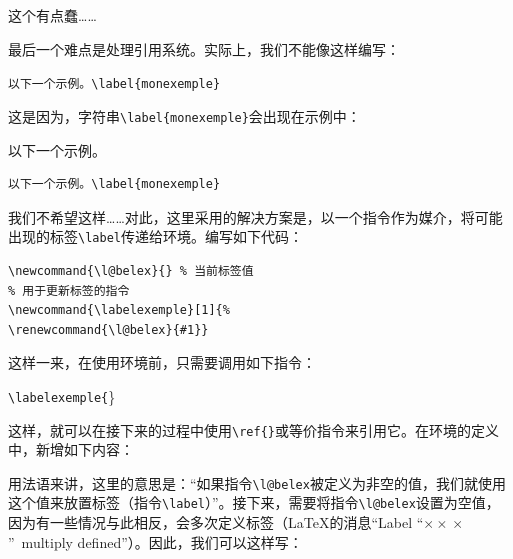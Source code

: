 \begin{ltxexempleiii}
  \setlength{\fboxsep}{-2pt}
  \setlength{\fboxrule}{.5mm}
  这个有点蠢……
\end{ltxexempleiii}

最后一个难点是处理引用系统。实际上，我们不能像这样编写：

\begin{dmd}
\verb|以下一个示例。\label{monexemple}|
\end{dmd}

这是因为，字符串\verb|\label{monexemple}|会出现在示例中：

\begin{codelist}[11.36]{
以下一个示例。
}
\begin{verbatim}
以下一个示例。\label{monexemple}\end{verbatim}
\end{codelist}

我们不希望这样……对此，这里采用的解决方案是，以一个指令作为媒介，将可能出现的标签\verb|\label|传递给环境。编写如下代码：

\begin{dmd}
\begin{verbatim}
\newcommand{\l@belex}{} % 当前标签值
% 用于更新标签的指令 
\newcommand{\labelexemple}[1]{%
\renewcommand{\l@belex}{#1}}\end{verbatim}
\end{dmd}

这样一来，在使用环境前，只需要调用如下指令：

\begin{dmd}
\verb|\labelexemple{|\}
\end{dmd}

这样，就可以在接下来的过程中使用\verb|\ref{|\verb+}+或等价指令来引用它。在环境的定义中，新增如下内容：

\begin{dmd}
\begin{verbatim}
% 如果当前标签不为空
\ifthenelse{\equal{\l@belex}{}}{}{%
    \label{\l@belex}}% 放置一个标签\end{verbatim}
\end{dmd}

用法语来讲，这里的意思是：“如果指令\verb|\l@belex|被定义为非空的值，我们就使用这个值来放置标签（指令\verb|\label|）”。接下来，需要将指令\verb|\l@belex|设置为空值，因为有一些情况与此相反，会多次定义标签（\LaTeX 的消息“Label ``$\times\!\times\!\times$''\ multiply defined”）。因此，我们可以这样写：

